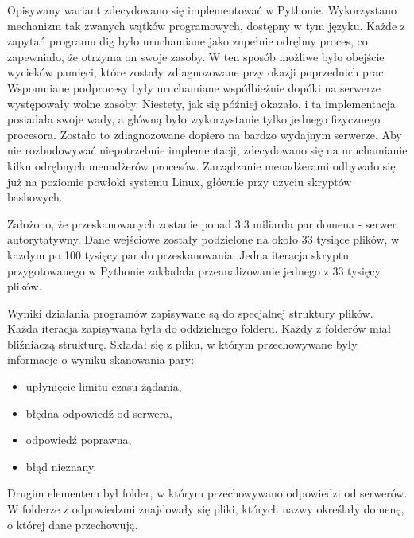 Opisywany wariant zdecydowano się implementować w Pythonie. Wykorzystano mechanizm tak zwanych wątków programowych, dostępny w tym języku. Każde z zapytań programu dig było uruchamiane jako zupełnie odrębny proces, co zapewniało, że otrzyma on swoje zasoby. W ten sposób możliwe było obejście wycieków pamięci, które zostały zdiagnozowane przy okazji poprzednich prac. Wspomniane podprocesy były uruchamiane współbieżnie dopóki na serwerze występowały wolne zasoby. Niestety, jak się później okazało, i ta implementacja posiadała swoje wady, a główną było wykorzystanie tylko jednego fizycznego procesora. Zostało to zdiagnozowane dopiero na bardzo wydajnym serwerze. Aby nie rozbudowywać niepotrzebnie implementacji, zdecydowano się na uruchamianie kilku odrębnych menadżerów procesów. Zarządzanie menadżerami odbywało się już na poziomie powłoki systemu Linux, głównie przy użyciu skryptów bashowych.

Założono, że przeskanowanych zostanie ponad 3.3 miliarda par domena - serwer autorytatywny. Dane wejściowe zostały podzielone na około 33 tysiące plików, w kazdym po 100 tysięcy par do przeskanowania. Jedna iteracja skryptu przygotowanego w Pythonie zakładała przeanalizowanie jednego z 33 tysięcy plików.

Wyniki działania programów zapisywane są do specjalnej struktury plików. Każda iteracja zapisywana była do oddzielnego folderu. Każdy z folderów miał bliźniaczą strukturę. Składał się z pliku, w którym przechowywane były informacje o wyniku skanowania pary:
\begin{itemize}
    \item upłynięcie limitu czasu żądania,
    \item błędna odpowiedź od serwera,
    \item odpowiedź poprawna,
    \item błąd nieznany.
\end{itemize}
Drugim elementem był folder, w którym przechowywano odpowiedzi od serwerów. W folderze z odpowiedzmi znajdowały się pliki, których nazwy określały domenę, o której dane przechowują. 

